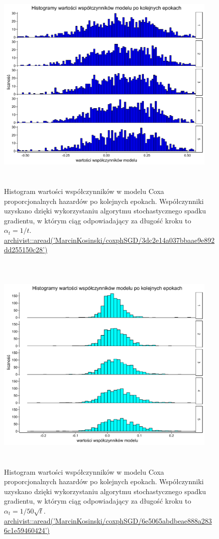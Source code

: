 \begin{figure}[!ht]
\centering
\includegraphics[width=0.95\textwidth, height = 280pt]{Obrazki/analiza/hist_overt_t.pdf}
\caption{\label{fig:hist1} Histogram wartości współczynników w modelu Coxa proporcjonalnych hazardów po kolejnych epokach. Współczynniki uzyskano dzięki wykorzystaniu algorytmu stochastycznego spadku gradientu, w którym ciąg odpowiadający za długość kroku to $\alpha_t = 1/t$. \href{https://github.com/MarcinKosinski/coxphSGD/blob/master/gallery/3dc2e14a037bbaae9e892dd255150c28.rda?raw=true}{archivist::aread('MarcinKosinski/coxphSGD/3dc2e14a037bbaae9e892dd255150c28')}}
\ \\
\includegraphics[width=0.95\textwidth, height = 280pt]{Obrazki/analiza/hist_over_50sqrt_t.pdf}
\caption{\label{fig:hist2} Histogram wartości współczynników w modelu Coxa proporcjonalnych hazardów po kolejnych epokach. Współczynniki uzyskano dzięki wykorzystaniu algorytmu stochastycznego spadku gradientu, w którym ciąg odpowiadający za długość kroku to $\alpha_t = 1/50\sqrt{t}$.
\href{https://github.com/MarcinKosinski/coxphSGD/blob/master/gallery/6e5065abdbeae888a2836c1e59460424.rda?raw=true}{archivist::aread('MarcinKosinski/coxphSGD/6e5065abdbeae888a2836c1e59460424')}}
\end{figure}
